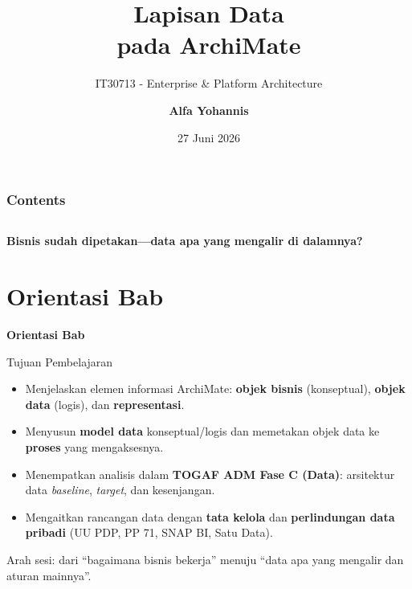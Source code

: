 \documentclass[aspectratio=169, table]{beamer}
\title{\huge Lapisan Data\\
  \vspace{8pt}
  pada ArchiMate}
\subtitle{IT30713 - Enterprise \& Platform Architecture}
\author{\textbf{Alfa Yohannis}}
\date{27 Juni 2026}
\newcommand{\sectionframe}[1]{%
  \begin{frame}{\hfill}
    \centering
    \Huge{\textbf{#1}}
  \end{frame}
}
\newcommand{\takeaway}[1]{%
  \vspace{4pt}
  {\footnotesize #1}
}
\begin{document}
\frame{\titlepage}

\begin{frame}[fragile]
  \frametitle{Contents}
  \vspace{20pt}
  \begin{columns}[t]
    \tableofcontents[sections={1-4}]

    \tableofcontents[sections={5-8}]
  \end{columns}
\end{frame}

\begin{frame}{\hfill}
  \centering
  \Huge{\textbf{Bisnis sudah dipetakan---data apa yang mengalir di dalamnya?}}
\end{frame}

\section{Orientasi Bab}
\sectionframe{Orientasi Bab}

\begin{frame}{Tujuan Pembelajaran}
  \vspace{6pt}
  \begin{itemize}
    \item Menjelaskan elemen informasi ArchiMate: \textbf{objek bisnis}
          (konseptual), \textbf{objek data} (logis), dan \textbf{representasi}.
    \item Menyusun \textbf{model data} konseptual/logis dan memetakan objek data
          ke \textbf{proses} yang mengaksesnya.
    \item Menempatkan analisis dalam \textbf{TOGAF ADM Fase C (Data)}: arsitektur
          data \emph{baseline}, \emph{target}, dan kesenjangan.
    \item Mengaitkan rancangan data dengan \textbf{tata kelola} dan
          \textbf{perlindungan data pribadi} (UU PDP, PP 71, SNAP BI, Satu Data).
  \end{itemize}
  \takeaway{Arah sesi: dari ``bagaimana bisnis bekerja'' menuju ``data apa yang
  mengalir dan aturan mainnya''.}
\end{frame}
\end{document}
